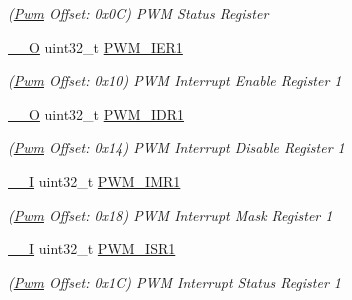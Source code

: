 \begin{DoxyCompactItemize}
\begin{DoxyCompactList}\small\item\em (\mbox{\hyperlink{structPwm}{Pwm}} Offset\+: 0x0C) P\+WM Status Register \end{DoxyCompactList}\item 
\mbox{\label{structPwm_a9f7dadba0c48b75b8ae3009d4eed86b2}} 
\mbox{\hyperlink{core__cm7_8h_a7e25d9380f9ef903923964322e71f2f6}{\+\_\+\+\_\+O}} uint32\+\_\+t \mbox{\hyperlink{structPwm_a9f7dadba0c48b75b8ae3009d4eed86b2}{P\+W\+M\+\_\+\+I\+E\+R1}}
\begin{DoxyCompactList}\small\item\em (\mbox{\hyperlink{structPwm}{Pwm}} Offset\+: 0x10) P\+WM Interrupt Enable Register 1 \end{DoxyCompactList}\item 
\mbox{\label{structPwm_ad62fa8b62132f43ecad377a1a2b4e9e3}} 
\mbox{\hyperlink{core__cm7_8h_a7e25d9380f9ef903923964322e71f2f6}{\+\_\+\+\_\+O}} uint32\+\_\+t \mbox{\hyperlink{structPwm_ad62fa8b62132f43ecad377a1a2b4e9e3}{P\+W\+M\+\_\+\+I\+D\+R1}}
\begin{DoxyCompactList}\small\item\em (\mbox{\hyperlink{structPwm}{Pwm}} Offset\+: 0x14) P\+WM Interrupt Disable Register 1 \end{DoxyCompactList}\item 
\mbox{\label{structPwm_a2c3b2b816a7371aa969783b0581a07f1}} 
\mbox{\hyperlink{core__cm7_8h_af63697ed9952cc71e1225efe205f6cd3}{\+\_\+\+\_\+I}} uint32\+\_\+t \mbox{\hyperlink{structPwm_a2c3b2b816a7371aa969783b0581a07f1}{P\+W\+M\+\_\+\+I\+M\+R1}}
\begin{DoxyCompactList}\small\item\em (\mbox{\hyperlink{structPwm}{Pwm}} Offset\+: 0x18) P\+WM Interrupt Mask Register 1 \end{DoxyCompactList}\item 
\mbox{\label{structPwm_ad51a82155083c0a472e38ec35ead027b}} 
\mbox{\hyperlink{core__cm7_8h_af63697ed9952cc71e1225efe205f6cd3}{\+\_\+\+\_\+I}} uint32\+\_\+t \mbox{\hyperlink{structPwm_ad51a82155083c0a472e38ec35ead027b}{P\+W\+M\+\_\+\+I\+S\+R1}}
\begin{DoxyCompactList}\small\item\em (\mbox{\hyperlink{structPwm}{Pwm}} Offset\+: 0x1C) P\+WM Interrupt Status Register 1 \end{DoxyCompactList}\item 

\end{DoxyCompactItemize}
